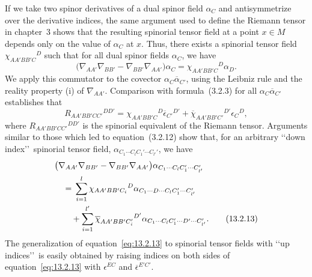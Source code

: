If we take two spinor derivatives of a dual spinor field \(\alpha_C\) and
antisymmetrize over the derivative indices, the same argument used to define the
Riemann tensor in chapter~3 shows that the resulting spinorial tensor field at a
point \(x\in M\) depends only on the value of \(\alpha_C\) at \(x\). Thus, there
exists a spinorial tensor field \(\chi_{AA'BB'C}{}^D\) such that for all dual
spinor fields \(\alpha_C\), we have
\begin{equation}
  \bigl(\nabla_{AA'}\nabla_{BB'}-\nabla_{BB'}\nabla_{AA'}\bigr)\alpha_C
  =\chi_{AA'BB'C}{}^D\alpha_D.
  \tag{13.2.11}\label{eq:13.2.11}
\end{equation}
We apply this commutator to the covector
\(\alpha_C\overline\alpha_{C'}\), using the Leibniz rule and the reality property
(i) of \(\nabla_{AA'}\). Comparison with formula~(3.2.3) for all
\(\alpha_C\overline\alpha_{C'}\) establishes that
\begin{equation}
  R_{AA'BB'CC'}{}^{DD'}
  =\chi_{AA'BB'C}{}^D\overline\epsilon_{C'}{}^{D'}
   +\overline\chi_{AA'BB'C'}{}^{D'}\epsilon_C{}^D,
  \tag{13.2.12}\label{eq:13.2.12}
\end{equation}
where \(R_{AA'BB'CC'}{}^{DD'}\) is the spinorial equivalent of the Riemann tensor.
Arguments similar to those which led to equation~(3.2.12) show that, for an
arbitrary \lq\lq down index\rq\rq\ spinorial tensor field,
\(\alpha_{C_1\cdots C_lC_1'\cdots C_{l'}'}\), we have
\begin{align}
  &\bigl(\nabla_{AA'}\nabla_{BB'}-\nabla_{BB'}\nabla_{AA'}\bigr)
    \alpha_{C_1\cdots C_lC_1'\cdots C_{l'}'}\notag\\
  &\quad={}\sum_{i=1}^l\chi_{AA'BB'C_i}{}^D
    \alpha_{C_1\cdots D\cdots C_lC_1'\cdots C_{l'}'}\notag\\
  &\qquad{}+\sum_{i=1}^{l'}\overline\chi_{AA'BB'C_i'}{}^{D'}
    \alpha_{C_1\cdots C_lC_1'\cdots D'\cdots C_{l'}'}.
  \tag{13.2.13}\label{eq:13.2.13}
\end{align}
The generalization of equation~\eqref{eq:13.2.13} to spinorial tensor fields with
\lq\lq up indices\rq\rq\ is easily obtained by raising indices on both sides of
equation~\eqref{eq:13.2.13} with \(\epsilon^{EC}\) and
\(\overline\epsilon^{E'C'}\).

